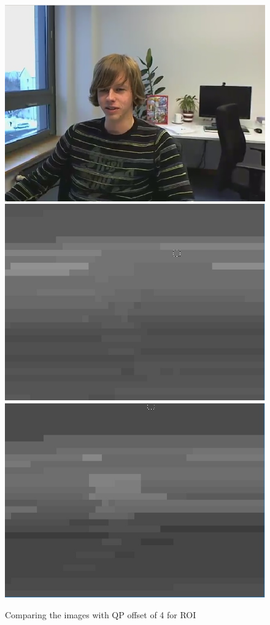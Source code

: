 \documentclass[11pt]{article} %
\begin{document}
\begin{figure}[!h]
    \includegraphics[scale=0.4]{QPOffset/paul120_250kbps_QPoffset4}
    \includegraphics[scale=0.37]{PaulDefault120_91250kbps_quant}
    \includegraphics[scale=0.4]{QPOffset/paul120_250kbps_QPoffset4_quant}    
    \caption{Comparing the images with QP offset of 4 for ROI}
    \label{fig:Default_QPOffsetCompare}
\end{figure}
\end{document}
